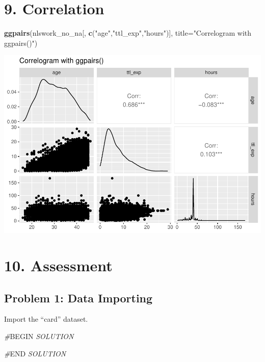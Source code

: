 \documentclass[
]{article}
\newenvironment{Shaded}{\begin{snugshade}}{\end{snugshade}}
\newcommand{\AttributeTok}[1]{\textcolor[rgb]{0.13,0.29,0.53}{#1}}
\newcommand{\CommentTok}[1]{\textcolor[rgb]{0.56,0.35,0.01}{\textit{#1}}}
\newcommand{\FunctionTok}[1]{\textcolor[rgb]{0.13,0.29,0.53}{\textbf{#1}}}
\newcommand{\NormalTok}[1]{#1}
\newcommand{\RegionMarkerTok}[1]{#1}
\newcommand{\StringTok}[1]{\textcolor[rgb]{0.31,0.60,0.02}{#1}}
\begin{document}
\hypertarget{correlation}{%
\section{9. Correlation}\label{correlation}}

\begin{Shaded}
\begin{Highlighting}[]
\FunctionTok{ggpairs}\NormalTok{(nlswork\_no\_na[, }\FunctionTok{c}\NormalTok{(}\StringTok{"age"}\NormalTok{,}\StringTok{"ttl\_exp"}\NormalTok{,}\StringTok{"hours"}\NormalTok{)], }\AttributeTok{title=}\StringTok{"Correlogram with ggpairs()"}\NormalTok{)}
\end{Highlighting}
\end{Shaded}

\includegraphics{RIntro_files/figure-latex/unnamed-chunk-23-1.pdf}

\hypertarget{assessment}{%
\section{10. Assessment}\label{assessment}}

\hypertarget{problem-1-data-importing}{%
\subsection{Problem 1: Data Importing}\label{problem-1-data-importing}}

Import the ``card'' dataset.

\begin{Shaded}
\begin{Highlighting}[]
\CommentTok{\#}\RegionMarkerTok{BEGIN}\CommentTok{ SOLUTION}

\CommentTok{\#}\RegionMarkerTok{END}\CommentTok{ SOLUTION}
\end{Highlighting}
\end{Shaded}
\end{document}
